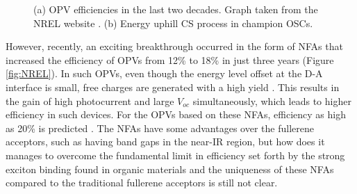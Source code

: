 \documentclass[12pt]{article}
\begin{document}
\begin{figure}[H]
\centering
{}
\caption{(a) OPV efficiencies in the last two decades. Graph taken from the NREL website \cite{NREL}. (b) Energy uphill CS process in champion OSCs.}
\label{fig:hot and cold}
\end{figure}

However, recently, an exciting breakthrough occurred in the form of NFAs that increased the efficiency of OPVs from 12\% to 18\% in just three years (Figure \ref{fig:NREL}). In such OPVs, even though the energy level offset at the D-A interface is small, free charges are generated with a high yield \cite{cheng2018next,hou2018organic,chen2018efficient}. This results in the gain of high photocurrent and large $V_{oc}$ simultaneously, which leads to higher efficiency in such devices. For the OPVs based on these NFAs, efficiency as high as 20\% is predicted \cite{li2018analyzing}.  The NFAs have some advantages over the fullerene acceptors, such as having band gaps in the near-IR region, but how does it manages to overcome the fundamental limit in efficiency set forth by the strong exciton binding found in organic materials and the uniqueness of these NFAs compared to the traditional fullerene acceptors is still not clear. 
\vspace{7pt}
\end{document}
